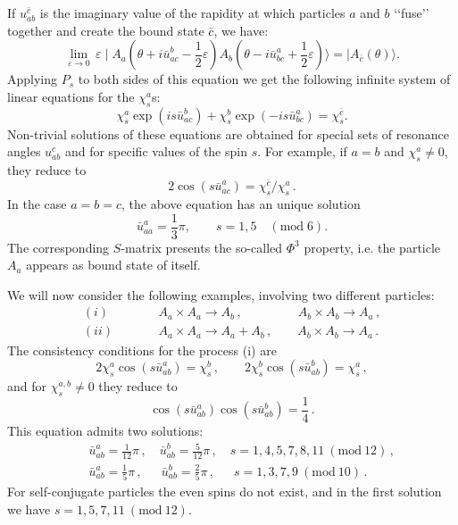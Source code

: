 \documentclass[a4paper,12pt]{report}
\begin{document}
If $u_{ab}^{\bar{c}}$ is the imaginary value of the rapidity at which particles $a$ and $b$ \lq\lq fuse\rq\rq\,
together and create the bound state $\bar{c}$, we have:
\begin{equation}
\lim_{\varepsilon\rightarrow 0}\,\varepsilon\mid
A_{a}\left(\theta+i\bar{u}_{ac}^{b}-\frac{1}{2}\varepsilon\right)A_{b}\left(\theta-i\bar{u}_{bc}^{a}+\frac{1}{2}\varepsilon\right)\rangle
=\mid A_{\bar{c}}\left(\theta\right)\rangle .
\end{equation}
Applying $P_{s}$ to both sides of this equation we get the following infinite system of linear equations for the
$\chi_{s}^{a}$s:
\begin{equation}\label{consisteq}
\chi_{s}^{a}\exp\left(is\bar{u}_{ac}^{b}\right)+\chi_{s}^{b}\exp\left(-is\bar{u}_{bc}^{a}\right)=\chi_{s}^{\bar{c}}.
\end{equation}
Non-trivial solutions of these equations are obtained for special sets of resonance angles $u_{ab}^{c}$ and for
specific values of the spin $s$. For example, if $a=b$ and $\chi_{s}^{a}\neq 0$, they reduce to
\begin{equation}
2\cos\left(s\bar{u}_{ac}^{a}\right)=\chi_{s}^{\bar{c}}/\chi_{s}^{a}\,.
\end{equation}
In the case $a=b=c$, the above equation has an unique solution
\begin{equation} \label{phi3}
\bar{u}_{aa}^{a}=\frac{1}{3}\pi, \qquad s=1,5 \quad (\textrm{mod}\;6).
\end{equation}
The corresponding $S$-matrix presents the so-called $\Phi^{3}$ property, i.e. the particle $A_{a}$ appears as
bound state of itself.


We will now consider the following examples, involving two different particles:
\begin{eqnarray}
(i) && \qquad A_{a}\times A_{a}\rightarrow A_{b}\,,\qquad\qquad\:\: A_{b}\times A_{b}\rightarrow A_{a}\,,\\
(ii)&& \qquad A_{a}\times A_{a}\rightarrow A_{a}+A_{b}\,,\qquad A_{b}\times A_{b}\rightarrow A_{a}\,.
\end{eqnarray}
The consistency conditions for the process (i) are
\begin{equation}
2\chi_{s}^{a}\cos\left(s\bar{u}_{ab}^{a}\right)=\chi_{s}^{b}\,,\qquad
2\chi_{s}^{b}\cos\left(s\bar{u}_{ab}^{b}\right)=\chi_{s}^{a}\,,
\end{equation}
and for $\chi_{s}^{a,b}\neq 0$ they reduce to
\begin{equation}
\cos\left(s\bar{u}_{ab}^{a}\right)\cos\left(s\bar{u}_{ab}^{b}\right)=\frac{1}{4}\,.
\end{equation}
This equation admits two solutions:
\begin{eqnarray}
&& \bar{u}_{ab}^{a}=\frac{1}{12}\pi\,, \quad \bar{u}_{ab}^{b}=\frac{5}{12}\pi\,, \quad s=1,4,5,7,8,11 \:(\textrm{mod}\:12)\,,\\
\label{isingfusang}&& \bar{u}_{ab}^{a}=\frac{1}{5}\pi\,, \quad\;\: \bar{u}_{ab}^{b}=\frac{2}{5}\pi\,, \quad \;\:
s=1,3,7,9 \:(\textrm{mod}\:10)\,.
\end{eqnarray}
For self-conjugate particles the even spins do not exist, and in the first solution we have $s=1,5,7,11
\:(\textrm{mod}\:12)$.
\end{document}
